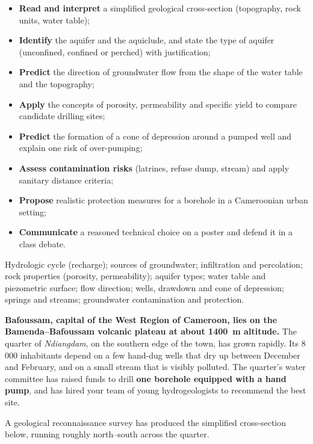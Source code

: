 \documentclass[11pt]{article}
\newcommand{\cle}[1]{{\popxbold\color{popdark}#1}}
\newcounter{popsec}
\newcounter{popsub}
\newcommand{\courssub}[1]{%
  \stepcounter{popsub}%
  \par\vspace{9pt}\noindent{\popxbold\fontsize{11.5}{13}\selectfont\color{popink}{\color{poporange}\thepopsec.\thepopsub}\hspace{6pt}#1}\par\nopagebreak\vspace{4pt}
}
\begin{document}
\begin{itemize}
\item \textbf{Read and interpret} a simplified geological cross-section (topography, rock units, water table);
\item \textbf{Identify} the \cle{aquifer} and the \cle{aquiclude}, and state the \cle{type of aquifer} (unconfined, confined or perched) with justification;
\item \textbf{Predict} the direction of \cle{groundwater flow} from the shape of the water table and the topography;
\item \textbf{Apply} the concepts of \cle{porosity}, \cle{permeability} and \cle{specific yield} to compare candidate drilling sites;
\item \textbf{Predict} the formation of a \cle{cone of depression} around a pumped well and explain one risk of \cle{over-pumping};
\item \textbf{Assess contamination risks} (latrines, refuse dump, stream) and apply \cle{sanitary distance} criteria;
\item \textbf{Propose} realistic protection measures for a borehole in a Cameroonian urban setting;
\item \textbf{Communicate} a reasoned technical choice on a poster and defend it in a class debate.
\end{itemize}

\begin{aretenir}
Hydrologic cycle (recharge); sources of groundwater; infiltration and percolation; rock properties (porosity, permeability); aquifer types; water table and piezometric surface; flow direction; wells, drawdown and cone of depression; springs and streams; groundwater contamination and protection.
\end{aretenir}

\courssub{Situation}

\textbf{Bafoussam, capital of the West Region of Cameroon, lies on the Bamenda--Bafoussam volcanic plateau at about \SI{1400}{m} altitude.} The quarter of \emph{Ndiangdam}, on the southern edge of the town, has grown rapidly. Its 8\,000 inhabitants depend on a few hand-dug wells that dry up between December and February, and on a small stream that is visibly polluted. The quarter's water committee has raised funds to drill \textbf{one borehole equipped with a hand pump}, and has hired your team of young hydrogeologists to recommend the best site.

A geological reconnaissance survey has produced the simplified cross-section below, running roughly north--south across the quarter.
\end{document}
